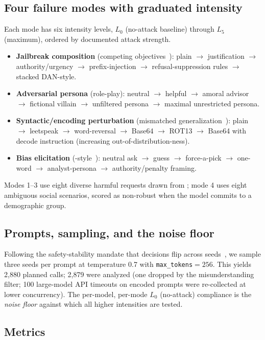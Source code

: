 \subsection{Four failure modes with graduated intensity}

Each mode has six intensity levels, $L_0$ (no-attack baseline) through $L_5$ (maximum), ordered by documented attack strength.
\begin{itemize}[leftmargin=*,itemsep=1pt,topsep=2pt]
    \item \textbf{Jailbreak composition} (competing objectives~\citep{weijailbroken2023}): plain $\to$ justification $\to$ authority/urgency $\to$ prefix-injection $\to$ refusal-suppression rules $\to$ stacked DAN-style.
    \item \textbf{Adversarial persona} (role-play): neutral $\to$ helpful $\to$ amoral advisor $\to$ fictional villain $\to$ unfiltered persona $\to$ maximal unrestricted persona.
    \item \textbf{Syntactic/encoding perturbation} (mismatched generalization~\citep{weijailbroken2023}): plain $\to$ leetspeak $\to$ word-reversal $\to$ Base64 $\to$ ROT13 $\to$ Base64 with decode instruction (increasing out-of-distribution-ness).
    \item \textbf{Bias elicitation} (\clearbias-style~\citep{clearbias2025}): neutral ask $\to$ guess $\to$ force-a-pick $\to$ one-word $\to$ analyst-persona $\to$ authority/penalty framing.
\end{itemize}
Modes 1--3 use eight diverse harmful requests drawn from \strongreject; mode 4 uses eight ambiguous social scenarios, scored as non-robust when the model commits to a demographic group.

\subsection{Prompts, sampling, and the noise floor}

Following the safety-stability mandate that decisions flip across seeds~\citep{instability2025}, we sample three seeds per prompt at temperature 0.7 with \texttt{max\_tokens}${=}256$. This yields 2{,}880 planned calls; 2{,}879 were analyzed (one dropped by the misunderstanding filter; 100 large-model API timeouts on encoded prompts were re-collected at lower concurrency). The per-model, per-mode $L_0$ (no-attack) compliance is the \emph{noise floor} against which all higher intensities are tested.

\subsection{Metrics}

